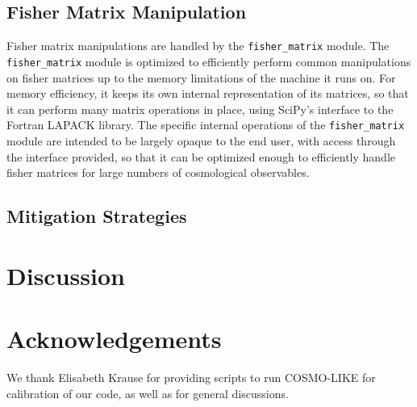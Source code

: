 \documentclass[a4paper,11pt]{article}
\begin{document}
\subsection{Fisher Matrix Manipulation}
Fisher matrix manipulations are handled by the \texttt{fisher\_matrix} module. The \texttt{fisher\_matrix} module is optimized to efficiently perform common manipulations on fisher matrices up to the memory limitations of the machine it runs on. For memory efficiency, it keeps its own internal representation of its matrices, so that it can perform many matrix operations in place, using SciPy's interface to the Fortran LAPACK library.  The specific internal operations of the \texttt{fisher\_matrix} module are intended to be largely opaque to the end user, with access through the interface provided, so that it can be optimized enough to efficiently handle fisher matrices for large numbers of cosmological observables. 



\subsection{Mitigation Strategies}
\section{Discussion} 

\section{Acknowledgements} 
We thank Elisabeth Krause for providing scripts to run COSMO-LIKE for calibration of our code, as well as for general discussions. 





\appendix 
\end{document}
